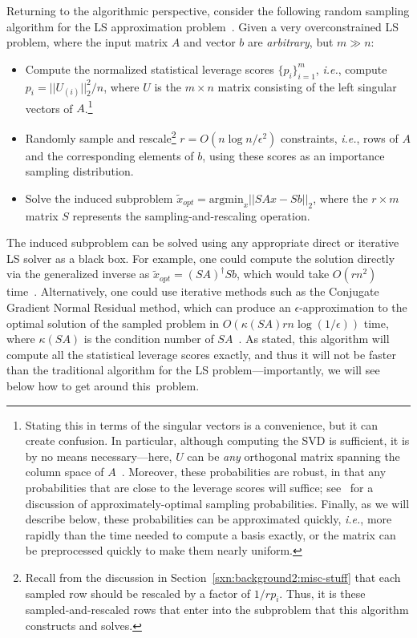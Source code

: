 \documentclass[twoside]{article}
\begin{document}
Returning to the algorithmic perspective, consider the following random 
sampling algorithm for the LS approximation 
problem~\cite{DMM06,DMM08_CURtheory_JRNL}.
Given a very overconstrained LS problem, where the input matrix
$A$ and vector $b$ are \emph{arbitrary}, but $m \gg n$:
\begin{itemize}
\item
Compute the normalized statistical leverage scores $\{p_i\}_{i=1}^{m}$, 
\emph{i.e.}, compute $p_i = ||U_{(i)}||_2^2/n$, where $U$ is the 
$m \times n$ matrix consisting of the left singular vectors of $A$.\footnote{Stating this in terms of the singular vectors is a convenience, 
but it can create confusion.  In particular, although computing the SVD 
is sufficient, it is by no means necessary---here, $U$ can be \emph{any} 
orthogonal matrix spanning the column space of $A$~\cite{CUR_PNAS}.  
Moreover, these probabilities are robust, in that any probabilities that 
are close to the leverage scores will suffice; see~\cite{dkm_matrix1} for 
a discussion of approximately-optimal sampling probabilities.
Finally, as we will describe below, these probabilities can be approximated
quickly, \emph{i.e.}, more rapidly than the time needed to compute a basis
exactly, or the matrix can be preprocessed quickly to make them nearly 
uniform.}
\item
Randomly sample and rescale\footnote{Recall from the discussion in 
Section~\ref{sxn:background2:misc-stuff} that each sampled row should be 
rescaled by a factor of $1/r p_i$.  Thus, it is these sampled-and-rescaled 
rows that enter into the subproblem that this algorithm constructs and solves.}
$r=O(n \log n /\epsilon^2 )$ constraints, 
\emph{i.e.}, rows of $A$ and the corresponding elements of $b$, using these
scores as an importance sampling distribution.
\item
Solve the induced subproblem
$ \tilde{x}_{opt} = \mbox{argmin}_x || S Ax - S b||_2  $, where the 
$r \times m$ matrix $S$ represents the sampling-and-rescaling operation.
\end{itemize}

\noindent
The induced subproblem can be solved using any appropriate direct or 
iterative LS solver as a black box.
For example, one could compute the solution directly via the generalized 
inverse as $ \tilde{x}_{opt} = \left(SA\right)^{\dagger}Sb $, which would 
take $O(rn^2)$ time~\cite{GVL96}.
Alternatively, one could use iterative methods such as the Conjugate 
Gradient Normal Residual method, which can produce an 
$\epsilon$-approximation to the optimal solution of the sampled problem in 
$O(\kappa(SA) rn \log(1/\epsilon) )$ time, where $\kappa(SA)$ is the 
condition number of $SA$~\cite{GVL96}.
As stated, this algorithm will compute all the statistical leverage scores
exactly, and thus it will not be faster than the traditional algorithm for
the LS problem---importantly, we will see below how to get around 
this~problem.
\end{document}
